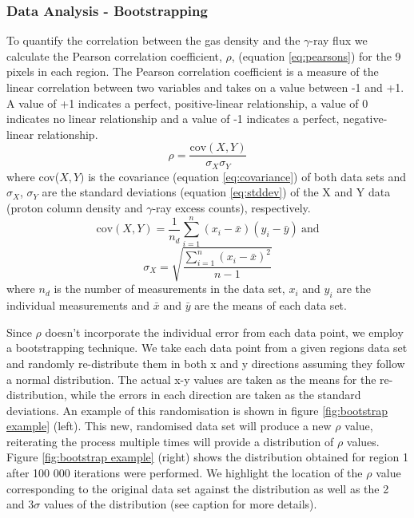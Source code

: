\documentclass[12pt,a4paper]{article}
\begin{document}
\subsubsection{Data Analysis - Bootstrapping}
To quantify the correlation between the gas density and the $\gamma$-ray flux we calculate the Pearson correlation coefficient, $\rho$, (equation \ref{eq:pearsons}) for the 9 pixels in each region. 
The Pearson correlation coefficient is a measure of the linear correlation between two variables and takes on a value between -1 and +1. 
A value of +1 indicates a perfect, positive-linear relationship, a value of 0 indicates no linear relationship and a value of -1 indicates a perfect, negative-linear relationship. 
\begin{equation}\label{eq:pearsons}
\rho = \dfrac{\mathrm{cov}(X,Y)}{\sigma_X \sigma_Y}
\end{equation}
where cov($X,Y)$ is the covariance (equation \ref{eq:covariance}) of both data sets and $\sigma_X$, $\sigma_Y$ are the standard deviations (equation \ref{eq:stddev}) of the X and Y data (proton column density and $\gamma$-ray excess counts), respectively.
\begin{equation}\label{eq:covariance}
\mathrm{cov}(X,Y) = \dfrac{1}{n_d} \sum_{i=1}^n (x_i - \bar{x})(y_i - \bar{y}) \ \mathrm{and}
\end{equation}
\begin{equation}\label{eq:stddev}
\sigma_X = \sqrt{\dfrac{\sum_{i=1}^n (x_i - \bar{x})^2}{n -1}}
\end{equation}
where $n_d$ is the number of measurements in the data set, $x_i$ and $y_i$ are the individual measurements and $\bar{x}$ and $\bar{y}$ are the means of each data set.

Since $\rho$ doesn't incorporate the individual error from each data point, we employ a bootstrapping technique. 
We take each data point from a given regions data set and randomly re-distribute them in both x and y directions assuming they follow a normal distribution. 
The actual x-y values are taken as the means for the re-distribution, while the errors in each direction are taken as the standard deviations. 
An example of this randomisation is shown in figure \ref{fig:bootstrap example} (left). 
This new, randomised data set will produce a new $\rho$ value, reiterating the process multiple times will provide a distribution of $\rho$ values. 
Figure \ref{fig:bootstrap example} (right) shows the distribution obtained for region 1 after 100 000 iterations were performed. 
We highlight the location of the $\rho$ value corresponding to the original data set against the distribution as well as the 2 and 3$\sigma$ values of the distribution (see caption for more details).
\end{document}
